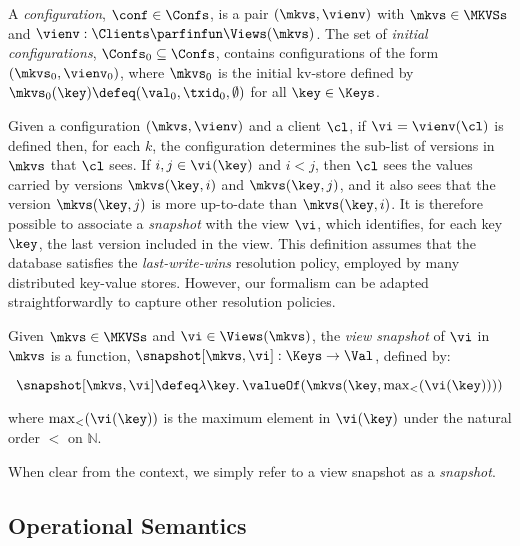 \SpaceAboveDef
\begin{definition}[Configurations]
\label{def:configuration}
A \emph{configuration}, \(\conf \in \Confs \),  is a pair \( (\mkvs, \vienv)\)
with \(\mkvs \in \MKVSs\) and
\(\vienv : \Clients \parfinfun \Views(\mkvs)\). 
The set of \emph{initial configurations}, \(\Confs_0 \subseteq \Confs\),
contains configurations of the form \( (\mkvs_0, \vienv_0)\), where
\(\mkvs_0\) is the initial kv-store defined by
\(\mkvs_{0}(\key)\defeq  (\val_0, \txid_0, \emptyset)\) for
all \(\key \in \Keys\). 
\end{definition}
\SpaceBelowDef


Given a configuration \((\mkvs, \vienv)\) and a client \(\cl\), 
if \(\vi = \vienv(\cl)\) is defined then, for each \(k\),  the
configuration determines the sub-list of versions in \(\mkvs\) that \(\cl\) sees.
If \(i,j \in \vi(\key)\) and \(i < j\), then \(\cl\) sees the values 
carried by versions \(\mkvs(\key, i)\) and  \(\mkvs(\key, j)\), 
and it also sees that the version \(\mkvs(\key, j)\) is more up-to-date than \(\mkvs(\key, i)\). 
It is therefore possible to associate a \emph{snapshot} with the view \(\vi\), 
which identifies, for each key \(\key\), the last version included in the view. 
This definition assumes that the database satisfies the \emph{last-write-wins}
resolution policy, employed by many distributed key-value stores.
However, our formalism can be adapted straightforwardly  to capture other resolution policies. 

\begin{definition}
\label{def:snapshot}
Given \(\mkvs \in \MKVSs\) and \(\vi \in \Views(\mkvs)\), the
\emph{view snapshot} of \(\vi\) in 
\(\mkvs\) is a function, 
\(\snapshot[\mkvs, \vi] : \Keys \to \Val\), 
defined by: 

\SpaceAboveMath[-15pt]
\[\snapshot[\mkvs, \vi] \defeq \lambda \key \ldotp \valueOf(\mkvs(\key, \textstyle \max_{<}(\vi(\key))))\]
\SpaceBelowMath[-15pt]

\noindent
where \(\max_{<}(\vi(\key))\) is the maximum element in \(\vi(\key)\) under the natural 
order \(<\) on \(\mathbb{N}\).
\end{definition}
\SpaceBelowDef
When clear from the context, we simply refer to a view snapshot as a {\em snapshot}. 


\subsection{Operational Semantics}
\label{subsec:kv-store-op}

